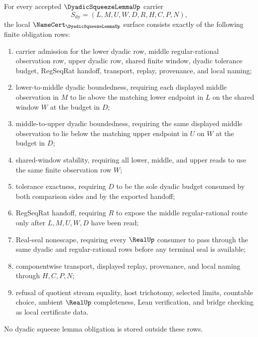 \begin{theorem}
\label{thm:dyadic-squeeze-lemma-namecert-obligations}
For every accepted $\DyadicSqueezeLemmaUp$ carrier
$$
S_{\mathrm{dy}}=(L,M,U,W,D,R,H,C,P,N),
$$
the local $\NameCert_{\DyadicSqueezeLemmaUp}$ surface consists exactly of the following finite obligation rows:
\begin{enumerate}
\item carrier admission for the lower dyadic row, middle regular-rational observation row, upper dyadic row, shared finite window, dyadic tolerance budget, RegSeqRat handoff, transport, replay, provenance, and local naming;
\item lower-to-middle dyadic boundedness, requiring each displayed middle observation in $M$ to lie above the matching lower endpoint in $L$ on the shared window $W$ at the budget in $D$;
\item middle-to-upper dyadic boundedness, requiring the same displayed middle observation to lie below the matching upper endpoint in $U$ on $W$ at the budget in $D$;
\item shared-window stability, requiring all lower, middle, and upper reads to use the same finite observation row $W$;
\item tolerance exactness, requiring $D$ to be the sole dyadic budget consumed by both comparison sides and by the exported handoff;
\item RegSeqRat handoff, requiring $R$ to expose the middle regular-rational route only after $L,M,U,W,D$ have been read;
\item Real-seal nonescape, requiring every $\RealUp$ consumer to pass through the same dyadic and regular-rational rows before any terminal seal is available;
\item componentwise transport, displayed replay, provenance, and local naming through $H,C,P,N$;
\item refusal of quotient stream equality, host trichotomy, selected limits, countable choice, ambient $\RealUp$ completeness, Lean verification, and bridge checking as local certificate data.
\end{enumerate}
No dyadic squeeze lemma obligation is stored outside these rows.
\end{theorem}
